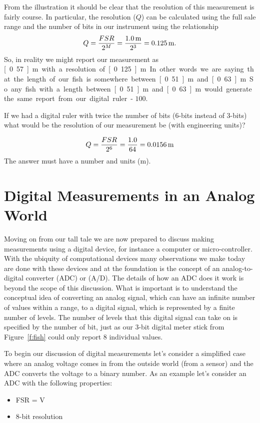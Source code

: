 From the illustration it should be clear that the resolution of this measurement is fairly course.  In particular, the resolution ($Q$) can be calculated using the full sale range and the number of bits in our instrument using the relationship
\begin{equation}
Q = \frac{FSR}{2^M} = \frac{\unit[1.0]{m}}{2^3} = \unit[0.125]{m}.
\end{equation}
So, in reality we might report our measurement as \unit[0.57]{m} with a resolution of  \unit[0.125]{m}.  In other words we are saying that the length of our fish is somewhere between \unit[0.51]{m} and \unit[0.63]{m}.  So any fish with a length between \unit[0.51]{m} and \unit[0.63]{m} would generate the same report from our digital ruler - $100$.

\begin{ex}
If we had a digital ruler with twice the number of bits (6-bits instead of 3-bits) what would be the resolution of our measurement be (with engineering units)?
\end{ex}

\ifsolutions
\begin{soln}
\[
Q = \frac{FSR}{2^6} = \frac{1.0}{64} = \unit[0.0156]{m}
\]
The answer must have a number and units (m).
\end{soln}
\fi


\section{Digital Measurements in an Analog World}
\label{s:dac}
Moving on from our tall tale we are now prepared to discuss making measurements using a digital device, for instance a computer or micro-controller.  With the ubiquity of computational devices many observations we make today are done with these devices and at the foundation is the concept of an \gls{analog-to-digital converter} (ADC) or (A/D).  The details of how an ADC does it work is beyond the scope of this discussion.  What is important is to understand the conceptual idea of converting an analog signal, which can have an infinite number of values within a range, to a digital signal, which is represented by a finite number of levels.  The number of levels that this digital signal can take on is specified by the number of bit, just as our 3-bit digital meter stick from Figure~\ref{f:fish} could only report 8 individual values.  

To begin our discussion of digital measurements let's consider a simplified case where an analog voltage comes in from the outside world (from a sensor) and the ADC converts the voltage to a binary number.  As an example let's consider an ADC with the following properties:
\begin{itemize}
\item FSR = \unit[0--10]{V}
\item 8-bit resolution
\end{itemize}

